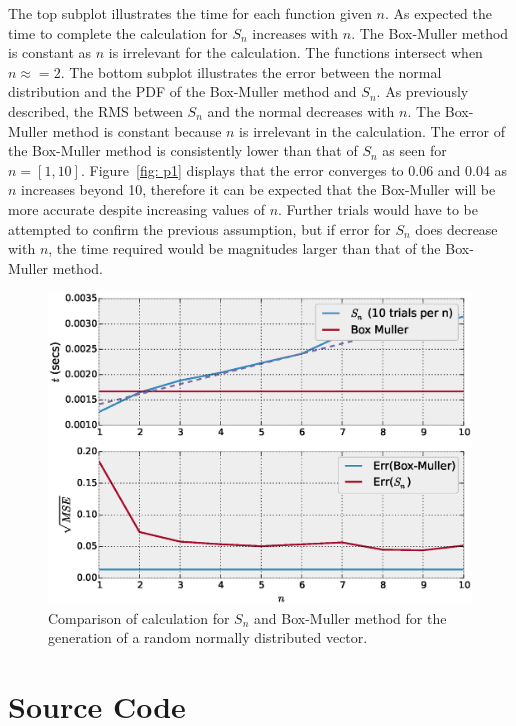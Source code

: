The top subplot illustrates the time for each function given $n$. As expected the time to complete the calculation for $S_n$ increases with $n$. The Box-Muller method is constant as $n$ is irrelevant for the calculation. The functions intersect when $n \approx = 2$. The bottom subplot illustrates the error between the normal distribution and the PDF of the Box-Muller method and $S_n$. As previously described, the RMS between $S_n$ and the normal decreases with $n$. The Box-Muller method is constant because $n$ is irrelevant in the calculation. The error of the Box-Muller method is consistently lower than that of $S_n$ as seen for $n = [1, 10]$. Figure~\ref{fig: p1} displays that the error converges to 0.06 and 0.04 as $n$ increases beyond 10, therefore it can be expected that the Box-Muller will be more accurate despite increasing values of $n$. Further trials would have to be attempted to confirm the previous assumption, but if error for $S_n$ does decrease with $n$, the time required would be magnitudes larger than that of the Box-Muller method. 

\begin{figure}[H] 
	\centering 
	\includegraphics[width=\linewidth]{figure_3}
	\caption{Comparison of calculation for $S_n$ and Box-Muller method for the generation of a random normally distributed vector.}
	\label{fig: p3} 
\end{figure}

\section{Source Code} 


